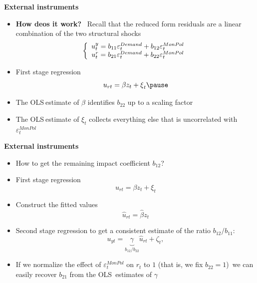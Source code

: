 \begin{frame}
{\textbf{External instruments}}\bigskip \medskip

\begin{itemize}
\item \textbf{How deos it work?} \ Recall that the reduced form residuals
are a linear combination of the two structural shocks 
\begin{equation*}
\left\{ 
\begin{array}{c}
u_{t}^{y}=b_{11}\varepsilon _{t}^{Demand}+b_{12}\varepsilon _{t}^{MonPol}{%
\mathbf{\medskip }} \\ 
u_{t}^{r}=b_{21}\varepsilon _{t}^{Demand}+b_{22}\varepsilon _{t}^{MonPol}%
\end{array}%
\right. 
\end{equation*}

\item First stage regression 
\begin{equation*}
u_{rt}=\beta z_{t}+\xi _{t}\pause
\end{equation*}

\item The OLS$\ $estimate of $\beta $ identifies $b_{22}$ up to a scaling
factor\bigskip \smallskip 

\item The OLS$\ $estimate of $\xi _{t}$ collects everything else that is
uncorrelated with $\varepsilon _{t}^{MonPol}$
\end{itemize}
\end{frame}


\begin{frame}
{\textbf{External instruments\vspace{-.1cm}}}

\begin{itemize}
\item How to get the remaining impact coefficient $b_{12}$?\bigskip \pause

\item First stage regression 
\begin{equation*}
u_{rt}=\beta z_{t}+\xi _{t}
\end{equation*}

\item Construct the fitted values 
\begin{equation*}
\hat{u}_{rt}=\hat{\beta}z_{t}
\end{equation*}%
\pause

\item Second stage regression to get a consistent estimate of the ratio $%
b_{12}/b_{11}$:%
\begin{equation*}
u_{yt}=\underset{b_{12}/b_{22}}{\underbrace{\gamma }}\hat{u}_{rt}+\zeta _{t},
\end{equation*}%
\pause

\item If we normalize the effect of $\varepsilon _{t}^{MonPol}$ on $r_{t}$
to $1$ (that is, we fix $b_{22}=1$)\ we can easily recover $b_{21}$ from the
OLS\ estimates of $\gamma $
\end{itemize}
\end{frame}

